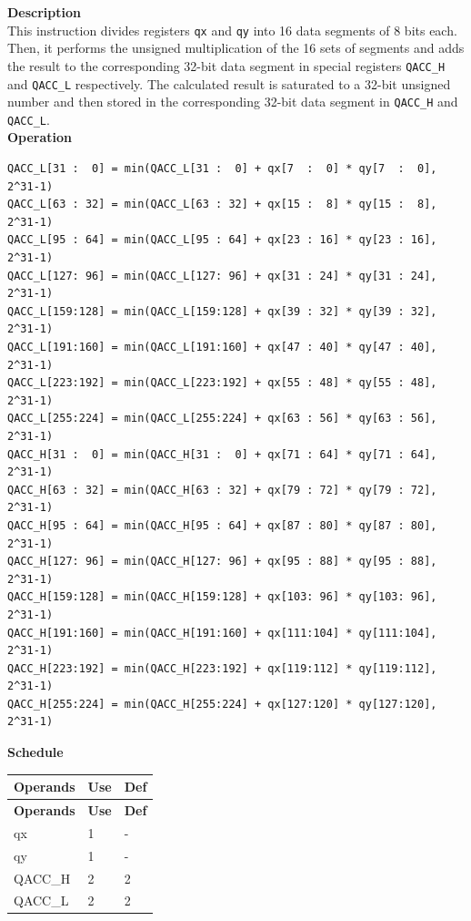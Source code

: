 \textbf{Description}\\
This instruction divides registers \lstinline{qx} and \lstinline{qy} into 16 data segments of 8 bits each. Then, it performs the unsigned multiplication of the 16 sets of segments and adds the result to the corresponding 32-bit data segment in special registers \lstinline{QACC_H} and \lstinline{QACC_L} respectively. The calculated result is saturated to a 32-bit unsigned number and then stored in the corresponding 32-bit data segment in \lstinline{QACC_H} and \lstinline{QACC_L}.\\

\textbf{Operation}\\

\begin{lstlisting}
QACC_L[31 :  0] = min(QACC_L[31 :  0] + qx[7  :  0] * qy[7  :  0], 2^31-1)
QACC_L[63 : 32] = min(QACC_L[63 : 32] + qx[15 :  8] * qy[15 :  8], 2^31-1)
QACC_L[95 : 64] = min(QACC_L[95 : 64] + qx[23 : 16] * qy[23 : 16], 2^31-1)
QACC_L[127: 96] = min(QACC_L[127: 96] + qx[31 : 24] * qy[31 : 24], 2^31-1)
QACC_L[159:128] = min(QACC_L[159:128] + qx[39 : 32] * qy[39 : 32], 2^31-1)
QACC_L[191:160] = min(QACC_L[191:160] + qx[47 : 40] * qy[47 : 40], 2^31-1)
QACC_L[223:192] = min(QACC_L[223:192] + qx[55 : 48] * qy[55 : 48], 2^31-1)
QACC_L[255:224] = min(QACC_L[255:224] + qx[63 : 56] * qy[63 : 56], 2^31-1)
QACC_H[31 :  0] = min(QACC_H[31 :  0] + qx[71 : 64] * qy[71 : 64], 2^31-1)
QACC_H[63 : 32] = min(QACC_H[63 : 32] + qx[79 : 72] * qy[79 : 72], 2^31-1)
QACC_H[95 : 64] = min(QACC_H[95 : 64] + qx[87 : 80] * qy[87 : 80], 2^31-1)
QACC_H[127: 96] = min(QACC_H[127: 96] + qx[95 : 88] * qy[95 : 88], 2^31-1)
QACC_H[159:128] = min(QACC_H[159:128] + qx[103: 96] * qy[103: 96], 2^31-1)
QACC_H[191:160] = min(QACC_H[191:160] + qx[111:104] * qy[111:104], 2^31-1)
QACC_H[223:192] = min(QACC_H[223:192] + qx[119:112] * qy[119:112], 2^31-1)
QACC_H[255:224] = min(QACC_H[255:224] + qx[127:120] * qy[127:120], 2^31-1)

\end{lstlisting}

\textbf{Schedule}\\
\begin{longtable}[c]{|l|l|l|}
    \hline
    \rowcolor{lightgray}
    \textbf{Operands} & \textbf{Use} & \textbf{Def} \\\hline
    \endfirsthead
    \hline
    \rowcolor{lightgray}
     \textbf{Operands} & \textbf{Use} & \textbf{Def} \\\hline
    \endhead
    \hline
    \endfoot

     qx & 1 & - \\\hline
     qy & 1 & - \\\hline
     QACC\_H & 2 & 2 \\\hline
     QACC\_L & 2 & 2

\end{longtable}

